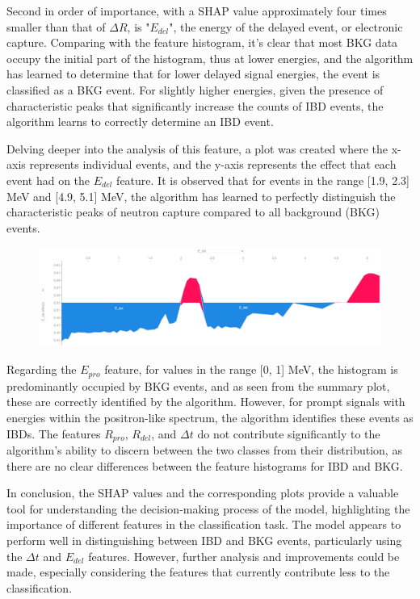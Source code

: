 Second in order of importance, with a SHAP value approximately four times smaller than that of $\Delta R$, is "$E_{del}$", the energy of the delayed event, or electronic capture. Comparing with the feature histogram, it's clear that most BKG data occupy the initial part of the histogram, thus at lower energies, and the algorithm has learned to determine that for lower delayed signal energies, the event is classified as a BKG event. For slightly higher energies, given the presence of characteristic peaks that significantly increase the counts of IBD events, the algorithm learns to correctly determine an IBD event. 

Delving deeper into the analysis of this feature, a plot was created where the x-axis represents individual events, and the y-axis represents the effect that each event had on the $E_{del}$ feature. It is observed that for events in the range [1.9, 2.3] MeV and [4.9, 5.1] MeV, the algorithm has learned to perfectly distinguish the characteristic peaks of neutron capture compared to all background (BKG) events.

\begin{figure}[h!]
	\centering
	\includegraphics[width=\linewidth]{Images/Shap/E_del_force_plot.png}
	\label{fig:E_del_force_plot}
\end{figure}

Regarding the $E_{pro}$ feature, for values in the range [0, 1] MeV, the histogram is predominantly occupied by BKG events, and as seen from the summary plot, these are correctly identified by the algorithm. However, for prompt signals with energies within the positron-like spectrum, the algorithm identifies these events as IBDs. The features $R_{pro}$, $R_{del}$, and $\Delta t$ do not contribute significantly to the algorithm's ability to discern between the two classes from their distribution, as there are no clear differences between the feature histograms for IBD and BKG.

In conclusion, the SHAP values and the corresponding plots provide a valuable tool for understanding the decision-making process of the model, highlighting the importance of different features in the classification task. The model appears to perform well in distinguishing between IBD and BKG events, particularly using the $\Delta t$ and $E_{del}$ features. However, further analysis and improvements could be made, especially considering the features that currently contribute less to the classification.


